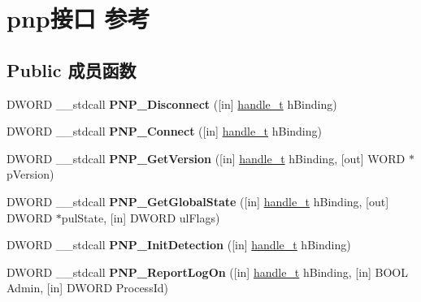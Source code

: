 \hypertarget{interfacepnp}{}\section{pnp接口 参考}
\label{interfacepnp}
\subsection*{Public 成员函数}
\begin{DoxyCompactItemize}
\item 
\mbox{\label{interfacepnp_ad09fe7ae7edc12376399eb51fb3cd568}} 
D\+W\+O\+RD \+\_\+\+\_\+stdcall {\bfseries P\+N\+P\+\_\+\+Disconnect} (\mbox{[}in\mbox{]} \hyperlink{interfacevoid}{handle\+\_\+t} h\+Binding)
\item 
\mbox{\label{interfacepnp_a432560d077fc4a9202d3817f4fe97283}} 
D\+W\+O\+RD \+\_\+\+\_\+stdcall {\bfseries P\+N\+P\+\_\+\+Connect} (\mbox{[}in\mbox{]} \hyperlink{interfacevoid}{handle\+\_\+t} h\+Binding)
\item 
\mbox{\label{interfacepnp_a405e632ea04a19051f7012dcdb38096a}} 
D\+W\+O\+RD \+\_\+\+\_\+stdcall {\bfseries P\+N\+P\+\_\+\+Get\+Version} (\mbox{[}in\mbox{]} \hyperlink{interfacevoid}{handle\+\_\+t} h\+Binding, \mbox{[}out\mbox{]} W\+O\+RD $\ast$p\+Version)
\item 
\mbox{\label{interfacepnp_aac77627130f27e2a74673d3b8413340c}} 
D\+W\+O\+RD \+\_\+\+\_\+stdcall {\bfseries P\+N\+P\+\_\+\+Get\+Global\+State} (\mbox{[}in\mbox{]} \hyperlink{interfacevoid}{handle\+\_\+t} h\+Binding, \mbox{[}out\mbox{]} D\+W\+O\+RD $\ast$pul\+State, \mbox{[}in\mbox{]} D\+W\+O\+RD ul\+Flags)
\item 
\mbox{\label{interfacepnp_a7a85775474182e41824f3bcd8c3b6278}} 
D\+W\+O\+RD \+\_\+\+\_\+stdcall {\bfseries P\+N\+P\+\_\+\+Init\+Detection} (\mbox{[}in\mbox{]} \hyperlink{interfacevoid}{handle\+\_\+t} h\+Binding)
\item 
\mbox{\label{interfacepnp_abb40f37b7af7d78f97954cfadc616054}} 
D\+W\+O\+RD \+\_\+\+\_\+stdcall {\bfseries P\+N\+P\+\_\+\+Report\+Log\+On} (\mbox{[}in\mbox{]} \hyperlink{interfacevoid}{handle\+\_\+t} h\+Binding, \mbox{[}in\mbox{]} B\+O\+OL Admin, \mbox{[}in\mbox{]} D\+W\+O\+RD Process\+Id)

\end{DoxyCompactItemize}
